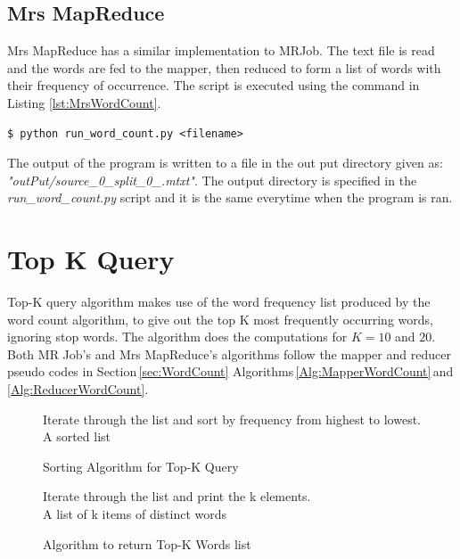 \documentclass[10pt, twocolumn]{article}
\makeatletter
\newcommand{\removelatexerror}{\let\@latex@error\@gobble}
\makeatother
\begin{document}
\subsection{Mrs MapReduce}
Mrs MapReduce has a similar implementation to MRJob. The text file is read and the words are fed to the mapper, then reduced to form a list of words with their frequency of occurrence.
The script is executed using the command in Listing \ref*{lst:MrsWordCount}.
\begin{center}
\begin{minipage}{0.95\columnwidth}
\begin{lstlisting}[style=bashStyle, label=lst:MrsWordCount, caption = Command to execute Word Count (Mrs)]
$ python run_word_count.py <filename>
\end{lstlisting}
\end{minipage}
\end{center}
The output of the program is written to a file in the out put directory given as: \emph{"outPut/source\_0\_split\_0\_.mtxt"}. The output directory is specified in the \emph{run\_word\_count.py} script and it is the same everytime when the program is ran. 
\section{Top K Query}
Top-K query algorithm makes use of the word frequency list produced by the word count algorithm, to give out the top K most frequently occurring words, ignoring stop words. The algorithm does the computations for $K = 10$ and $20$.  Both MR Job's and Mrs MapReduce's algorithms follow the mapper and reducer pseudo codes in Section\,\ref{sec:WordCount} Algorithms\,\ref{Alg:MapperWordCount}\,and\,\ref{Alg:ReducerWordCount}.

\begin{figure}[H]
     \removelatexerror
    \begin{algorithm}[H]
       \label{Alg:SortingTopKQuery}
        \caption{Sorting Algorithm for Top-K Query}
        Iterate through the list and sort by frequency from highest to lowest.\\
        \Return A sorted list
    \end{algorithm}
\end{figure}
\begin{figure}[H]
     \removelatexerror
    \begin{algorithm}[H]
       \label{Alg:TruncateTopKQuery}
        \caption{Algorithm to return Top-K Words list}
        Iterate through the list and print the k elements.\\
        \Return A list of k items of distinct words
    \end{algorithm}
\end{figure}
\end{document}
